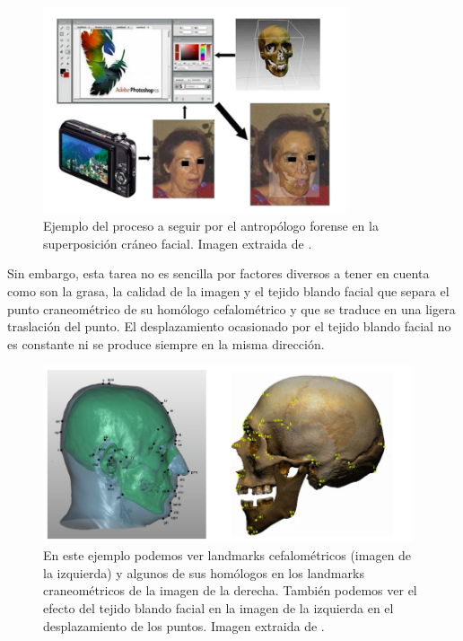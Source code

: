 \begin{figure}[!h]
    \centering
    \includegraphics[width=0.8\textwidth]{img/ejemplo_SCF_intro.png}
    \caption{Ejemplo del proceso a seguir por el antropólogo forense en la superposición cráneo facial. Imagen extraida de \cite{damas2020handbook}.}
\end{figure}

\medskip

\noindent Sin embargo, esta tarea no es sencilla por factores diversos a tener en cuenta como son la grasa, la calidad de la imagen y el tejido blando facial que separa el punto craneométrico de su homólogo cefalométrico y que se traduce en una ligera traslación del punto. El desplazamiento ocasionado por el tejido blando facial no es constante ni se produce siempre en la misma dirección. 

\begin{figure}[!h]
    \centering
    \includegraphics[width=0.97\textwidth]{img/marcado_landmarks.png}
    \caption{En este ejemplo podemos ver landmarks cefalométricos (imagen de la izquierda) y algunos de sus homólogos en los landmarks craneométricos de la imagen de la derecha. También podemos ver el efecto del tejido blando facial en la imagen de la izquierda en el desplazamiento de los puntos. Imagen extraida de \cite{damas2020handbook}.}
\end{figure}

